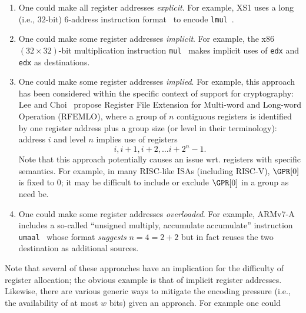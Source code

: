 \begin{itemize}
      \begin{enumerate}
      \item One could make all  register addresses {\em explicit}.
            For example, XS1 uses a long (i.e., $32$-bit) $6$-address 
            instruction format~\cite[Page 246]{SCARV:XS1:09} 
            to encode
            {\tt lmul}~\cite[Page 146]{SCARV:XS1:09}.
      \item One could make some register addresses {\em implicit}.  
            For example, the x86 $( 32 \times 32 )$-bit multiplication 
            instruction 
            {\tt mul}~\cite[Page 4-144--4-145]{SCARV:X86:2:18} 
            makes implicit uses of {\tt edx} and {\tt edx} as destinations.
      \item One could make some register addresses {\em implied}.
            For example, this approach has been considered within the
            specific context of support for cryptography: 
            Lee and Choi~\cite{SCARV:LeeCho:08} propose Register File
            Extension for Multi-word and Long-word Operation (RFEMLO), 
            where a group of $n$ contiguous registers is identified by 
            one register address plus a group size (or level in their terminology): 
            address $i$ and level $n$ implies use of registers
            \[
            i, i + 1, i + 2, \ldots i + 2^n - 1 .
            \]
            Note that this approach potentially causes an issue wrt.
            registers with specific semantics.  For example, in many
            RISC-like ISAs (including RISC-V), $\GPR[0]$ is fixed to 
            $0$; it may be difficult to include or exclude $\GPR[0]$ 
            in a group as need be.
      \item One could make some register addresses {\em overloaded}.
            For example, ARMv7-A includes a so-called ``unsigned multiply,
            accumulate accumulate'' instruction 
            {\tt umaal}~\cite[Section A8.8.255]{SCARV:ARMv7_M:17} 
            whose format {\em suggests} $n = 4 = 2 + 2$ but in fact 
            reuses the two destination as additional sources.
      \end{enumerate}
      
      \noindent
      Note that several of these approaches have an implication for the
      difficulty of register allocation; the obvious example is that of
      implicit register addresses.  Likewise, there are various generic
      ways to mitigate the encoding pressure (i.e., the availability of 
      at most $w$ bits) given an approach.  For example one could
      

\end{itemize}
